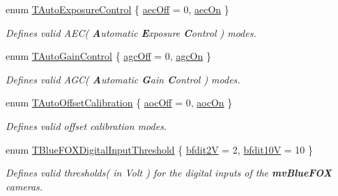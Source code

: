 \begin{DoxyCompactItemize}
enum \hyperlink{group___device_specific_interface_gaa3925d7c57549537aff5ba88e4663d1a}{T\+Auto\+Exposure\+Control} \{ \hyperlink{group___device_specific_interface_ggaa3925d7c57549537aff5ba88e4663d1aaac58522c340357a12a0eb78df483baef}{aec\+Off} = 0, 
\hyperlink{group___device_specific_interface_ggaa3925d7c57549537aff5ba88e4663d1aa5da6a282b99ff60ebc9dc31d8860f245}{aec\+On}
 \}
\begin{DoxyCompactList}\small\item\em Defines valid A\+E\+C( {\bfseries A}utomatic {\bfseries E}xposure {\bfseries C}ontrol ) modes. \end{DoxyCompactList}\item 
enum \hyperlink{group___device_specific_interface_ga5b3b072118cc04a2868720d230315c3a}{T\+Auto\+Gain\+Control} \{ \hyperlink{group___device_specific_interface_gga5b3b072118cc04a2868720d230315c3aaf62ddbd4ed6eea1cffbc3c3b8810617a}{agc\+Off} = 0, 
\hyperlink{group___device_specific_interface_gga5b3b072118cc04a2868720d230315c3aa269cbf04d42dbabc353737fc39e86af5}{agc\+On}
 \}
\begin{DoxyCompactList}\small\item\em Defines valid A\+G\+C( {\bfseries A}utomatic {\bfseries G}ain {\bfseries C}ontrol ) modes. \end{DoxyCompactList}\item 
enum \hyperlink{group___device_specific_interface_ga56384be04e2e0eccd6349fa8bc18d59a}{T\+Auto\+Offset\+Calibration} \{ \hyperlink{group___device_specific_interface_gga56384be04e2e0eccd6349fa8bc18d59aac91bf0f8c80d1b1375cc3b656a645da2}{aoc\+Off} = 0, 
\hyperlink{group___device_specific_interface_gga56384be04e2e0eccd6349fa8bc18d59aa49236b844c751cd763c343395dfaf7ce}{aoc\+On}
 \}
\begin{DoxyCompactList}\small\item\em Defines valid offset calibration modes. \end{DoxyCompactList}\item 
enum \hyperlink{group___device_specific_interface_gaea9362b2595ba187912465c014ddc069}{T\+Blue\+F\+O\+X\+Digital\+Input\+Threshold} \{ \hyperlink{group___device_specific_interface_ggaea9362b2595ba187912465c014ddc069abc73e2bbe308a3d2cc319a2cb55843e2}{bfdit2\+V} = 2, 
\hyperlink{group___device_specific_interface_ggaea9362b2595ba187912465c014ddc069a8da7c114737b7e738997019a3dc6412d}{bfdit10\+V} = 10
 \}
\begin{DoxyCompactList}\small\item\em Defines valid thresholds( in Volt ) for the digital inputs of the {\bfseries mv\+Blue\+F\+O\+X} cameras. \end{DoxyCompactList}\item 

\end{DoxyCompactItemize}
